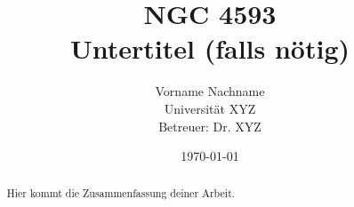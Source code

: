 \documentclass[a4paper,12pt]{report}
\title{\textbf{NGC 4593} \\ \Large Untertitel (falls nötig)}
\author{Vorname Nachname \\ Universität XYZ \\ Betreuer: Dr. XYZ}
\date{\today}
\begin{document}
	
	\maketitle
	\thispagestyle{empty}
	\newpage
	
	\begin{abstract}
		Hier kommt die Zusammenfassung deiner Arbeit.
	\end{abstract}
	\newpage
	
	\tableofcontents
	\newpage
	
	\listoffigures
	\listoftables
	\newpage
	
	
	
	
	\printbibliography
	
	\appendix
	
	
\end{document}
